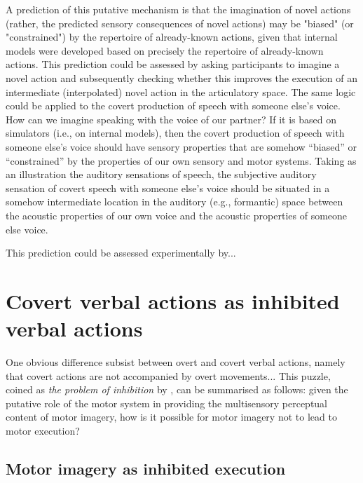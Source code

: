 \documentclass[utf8]{template/frontiersSCNS} %
\begin{document}
A prediction of this putative mechanism is that the imagination of novel actions (rather, the predicted sensory consequences of novel actions) may be "biased" (or "constrained") by the repertoire of already-known actions, given that internal models were developed based on precisely the repertoire of already-known actions. This prediction could be assessed by asking participants to imagine a novel action and subsequently checking whether this improves the execution of an intermediate (interpolated) novel action in the articulatory space. The same logic could be applied to the covert production of speech with someone else’s voice. How can we imagine speaking with the voice of our partner? If it is based on simulators (i.e., on internal models), then the covert production of speech with someone else’s voice should have sensory properties that are somehow “biased” or “constrained” by the properties of our own sensory and motor systems. Taking as an illustration the auditory sensations of speech, the subjective auditory sensation of covert speech with someone else’s voice should be situated in a somehow intermediate location in the auditory (e.g., formantic) space between the acoustic properties of our own voice and the acoustic properties of someone else voice.

This prediction could be assessed experimentally by...

\section{Covert verbal actions as inhibited verbal actions}

One obvious difference subsist between overt and covert verbal actions, namely that covert actions are not accompanied by overt movements... This puzzle, coined as \textit{the problem of inhibition} by \cite{jeannerod_neural_2001}, can be summarised as follows: given the putative role of the motor system in providing the multisensory perceptual content of motor imagery, how is it possible for motor imagery not to lead to motor execution?

\subsection{Motor imagery as inhibited execution}

\end{document}
